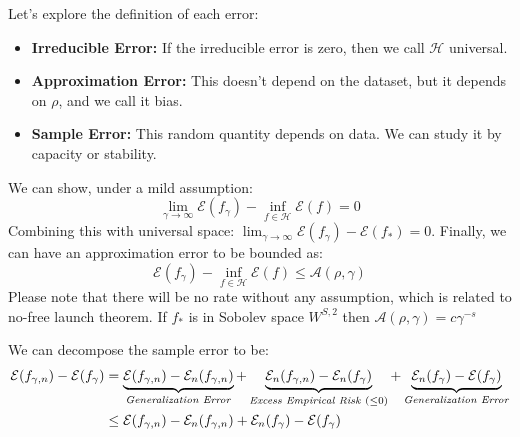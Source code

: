 \begin{remark}
    Let's explore the definition of each error:
    \begin{itemize}
        \item \textbf{Irreducible Error: } If the irreducible error is zero, then we call $ \mathcal{H} $ universal.
        \item \textbf{Approximation Error: } This doesn't depend on the dataset, but it depends on $\rho$, and we call it bias.
        \item \textbf{Sample Error: } This random quantity depends on data. We can study it by capacity or stability.
    \end{itemize}
    We can show, under a mild assumption:
    \begin{equation*}
        \lim_{\gamma\rightarrow\infty}\mathcal{E}(f_\gamma) - \inf_{f\in\mathcal{H}}\mathcal{E}(f) = 0
    \end{equation*}
    Combining this with universal space: $\lim_{\gamma\rightarrow\infty}\mathcal{E}(f_\gamma) - \mathcal{E}(f_*)=0$. Finally, we can have an approximation error to be bounded as:
    \begin{equation*}
        \mathcal{E}(f_\gamma) - \inf_{f\in\mathcal{H}}\mathcal{E}(f) \le \mathcal{A}(\rho,\gamma)
    \end{equation*}
    Please note that there will be no rate without any assumption, which is related to no-free launch theorem. If $f_*$ is in Sobolev space $W^{S, 2}$ then $\mathcal{A}(\rho, \gamma)=c\gamma^{-s}$
\end{remark}

\begin{proposition}
    We can decompose the sample error to be:
    \begin{equation*}
    \begin{aligned}
        \mathcal{E}(f_{\gamma, n}) - \mathcal{E}(f_\gamma) &= \underbrace{\mathcal{E}(f_{\gamma, n}) - \mathcal{E}_n(f_{\gamma, n})}_{\text{\emph{Generalization Error}}} + \underbrace{\mathcal{E}_n(f_{\gamma, n}) - \mathcal{E}_n(f_{\gamma})}_{\text{\emph{Excess Empirical Risk }} (\le 0) } + \underbrace{\mathcal{E}_n(f_{\gamma}) - \mathcal{E}(f_\gamma)}_{\text{\emph{Generalization Error}}} \\ 
        &\le \mathcal{E}(f_{\gamma, n}) - \mathcal{E}_n(f_{\gamma, n}) + \mathcal{E}_n(f_{\gamma}) - \mathcal{E}(f_\gamma) \\ 
    \end{aligned}
    \end{equation*}
\end{proposition}


